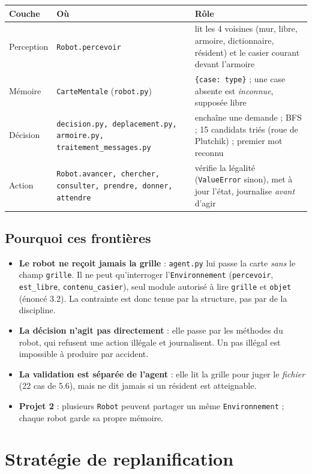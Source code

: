 \documentclass[11pt,a4paper]{article}
\newcommand{\code}[1]{\texttt{#1}}
\newcommand{\cle}[1]{\textbf{#1}}
\begin{document}
\raggedright
\begin{tabular}{@{}p{1.7cm}p{5.9cm}p{9.0cm}@{}}
\toprule
\cle{Couche} & \cle{Où} & \cle{Rôle} \\
\midrule
Perception & \code{Robot.percevoir} & lit les 4 voisines (mur, libre, armoire, dictionnaire, résident) et le casier courant devant l'armoire \\
Mémoire & \code{CarteMentale} (\code{robot.py}) & \code{\{case: type\}} ; une case absente est \emph{inconnue}, supposée libre \\
Décision & \raggedright\code{decision.py, deplacement.py, armoire.py, traitement\_messages.py} & enchaîne une demande ; BFS ; 15 candidats triés (roue de Plutchik) ; premier mot reconnu \\
Action & \raggedright\code{Robot.avancer, chercher, consulter, prendre, donner, attendre} & vérifie la légalité (\code{ValueError} sinon), met à jour l'état, journalise \emph{avant} d'agir \\
\bottomrule
\end{tabular}

\subsection*{Pourquoi ces frontières}
\begin{itemize}
  \item \cle{Le robot ne reçoit jamais la grille} : \code{agent.py} lui passe la carte \emph{sans} le champ \code{grille}. Il ne peut qu'interroger l'\code{Environnement} (\code{percevoir}, \code{est\_libre}, \code{contenu\_casier}), seul module autorisé à lire \code{grille} et \code{objet} (énoncé 3.2). La contrainte est donc tenue par la structure, pas par de la discipline.
  \item \cle{La décision n'agit pas directement} : elle passe par les méthodes du robot, qui refusent une action illégale et journalisent. Un pas illégal est impossible à produire par accident.
  \item \cle{La validation est séparée de l'agent} : elle lit la grille pour juger le \emph{fichier} (22 cas de 5.6), mais ne dit jamais si un résident est atteignable.
  \item \cle{Projet 2} : plusieurs \code{Robot} peuvent partager un même \code{Environnement} ; chaque robot garde sa propre mémoire.
\end{itemize}

\section{Stratégie de replanification}
\end{document}
